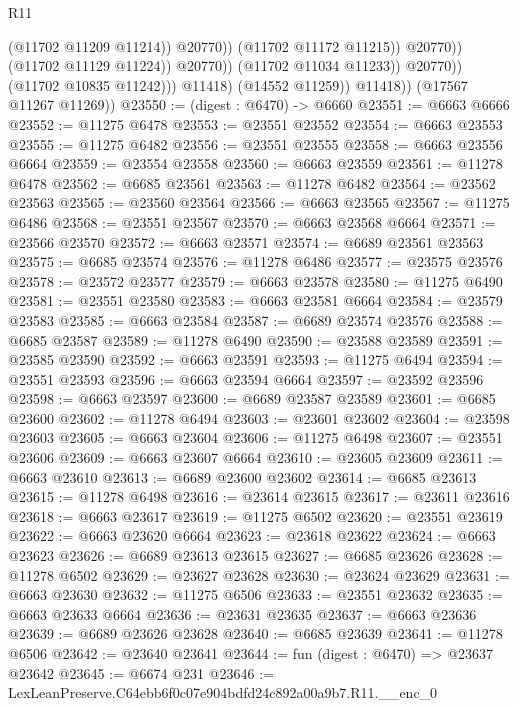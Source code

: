 \begin{lexlean}{R11}
\begin{coremodule}
                                          (@11702 @11209 @11214))
                                        @20770))
                                    (@11702 @11172 @11215))
                                  @20770))
                              (@11702 @11129 @11224))
                            @20770))
                        (@11702 @11034 @11233))
                      @20770))
                  (@11702 @10835 @11242)))
              @11418)
            (@14552 @11259))
          @11418))
      (@17567 @11267 @11269))
@23550 := (digest : @6470) -> @6660
@23551 := @6663 @6666
@23552 := @11275 @6478
@23553 := @23551 @23552
@23554 := @6663 @23553
@23555 := @11275 @6482
@23556 := @23551 @23555
@23558 := @6663 @23556 @6664
@23559 := @23554 @23558
@23560 := @6663 @23559
@23561 := @11278 @6478
@23562 := @6685 @23561
@23563 := @11278 @6482
@23564 := @23562 @23563
@23565 := @23560 @23564
@23566 := @6663 @23565
@23567 := @11275 @6486
@23568 := @23551 @23567
@23570 := @6663 @23568 @6664
@23571 := @23566 @23570
@23572 := @6663 @23571
@23574 := @6689 @23561 @23563
@23575 := @6685 @23574
@23576 := @11278 @6486
@23577 := @23575 @23576
@23578 := @23572 @23577
@23579 := @6663 @23578
@23580 := @11275 @6490
@23581 := @23551 @23580
@23583 := @6663 @23581 @6664
@23584 := @23579 @23583
@23585 := @6663 @23584
@23587 := @6689 @23574 @23576
@23588 := @6685 @23587
@23589 := @11278 @6490
@23590 := @23588 @23589
@23591 := @23585 @23590
@23592 := @6663 @23591
@23593 := @11275 @6494
@23594 := @23551 @23593
@23596 := @6663 @23594 @6664
@23597 := @23592 @23596
@23598 := @6663 @23597
@23600 := @6689 @23587 @23589
@23601 := @6685 @23600
@23602 := @11278 @6494
@23603 := @23601 @23602
@23604 := @23598 @23603
@23605 := @6663 @23604
@23606 := @11275 @6498
@23607 := @23551 @23606
@23609 := @6663 @23607 @6664
@23610 := @23605 @23609
@23611 := @6663 @23610
@23613 := @6689 @23600 @23602
@23614 := @6685 @23613
@23615 := @11278 @6498
@23616 := @23614 @23615
@23617 := @23611 @23616
@23618 := @6663 @23617
@23619 := @11275 @6502
@23620 := @23551 @23619
@23622 := @6663 @23620 @6664
@23623 := @23618 @23622
@23624 := @6663 @23623
@23626 := @6689 @23613 @23615
@23627 := @6685 @23626
@23628 := @11278 @6502
@23629 := @23627 @23628
@23630 := @23624 @23629
@23631 := @6663 @23630
@23632 := @11275 @6506
@23633 := @23551 @23632
@23635 := @6663 @23633 @6664
@23636 := @23631 @23635
@23637 := @6663 @23636
@23639 := @6689 @23626 @23628
@23640 := @6685 @23639
@23641 := @11278 @6506
@23642 := @23640 @23641
@23644 := fun (digest : @6470) => @23637 @23642
@23645 := @6674 @231
@23646 := LexLeanPreserve.C64ebb6f0c07e904bdfd24c892a00a9b7.R11.__enc_0

\end{coremodule}
\end{lexlean}

